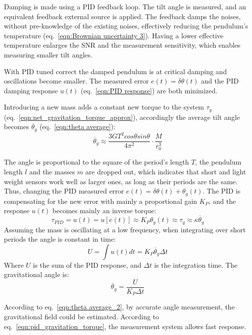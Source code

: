 \documentclass[\main/master.tex]{subfiles}
\begin{document}
\par\noindent
Damping is made using a PID feedback loop. The tilt angle is measured, and an equivalent feedback external source is applied. The feedback damps the noises, without pre-knowledge of the existing noises, effectively reducing the pendulum's temperature (eq.~\ref{eqn:Brownian uncertainty 3}). Having a lower effective temperature enlarges the SNR and the measurement sensitivity, which enables measuring smaller tilt angles.
\par\noindent
With PID tuned correct the damped pendulum is at critical damping and oscillations become smaller. The measured error $e(t) = \delta\theta(t)$ and the PID damping response $u(t)$ (eq.~\ref{eqn:PID response}) are both minimized. 
\par\noindent
Introducing a new mass adds a constant new torque to the system $\tau_g$ (eq.~\ref{eqn:net_gravitation_torque_approx}), accordingly the average tilt angle becomes $\overline{\theta}_g$ (eq.~\ref{eqn:theta average}):
\begin{equation}
\overline{\theta}_g  \approx \frac{3GT^2cos\theta sin\theta}{4\pi^2 } \cdot \frac{M}{r_0^3}   \label{eqn:theta average_2}
\end{equation}
\par\noindent
The angle is proportional to the square of the period's length $T$, the pendulum length $l$ and the masses $m$ are dropped out, which indicates that short and light weight sensors work well as larger ones, as long as their periods are the same. Thus, changing the PID measured error $e(t) = \delta\theta(t) + \theta_g(t)$. The PID is compensating for the new error with mainly a proportional gain $K_P$, and the response $u(t)$ becomes mainly an inverse torque:
\begin{equation}
\tau_{PID} = u(t) = u[e(t)] \approx K_P\theta_g(t) \approx \tau_{g} \approx \kappa \overline{\theta}_g 
\label{eqn:PID_response}
\end{equation}
Assuming the mass is oscillating at a low frequency, when integrating over short periods the angle is constant in time:
\begin{equation}
U = \int u(t) dt = K_P\overline{\theta}_g\Delta t 
\label{eqn:PID_measurement_eqn}
\end{equation}
Where $U$ is the sum of the PID response, and $\Delta t$ is the integration time. The gravitational angle is:
\begin{equation}
\overline{\theta}_g = \frac{U}{K_P\Delta t}      \label{eqn:pid_gravitation_torque}
\end{equation}
\par\noindent
According to eq.~\ref{eqn:theta average_2}, by accurate angle measurement, the gravitational field could be estimated. According to eq.~\ref{eqn:pid_gravitation_torque}, the measurement system allows fast response. 

 
 
 
 
\end{document}
